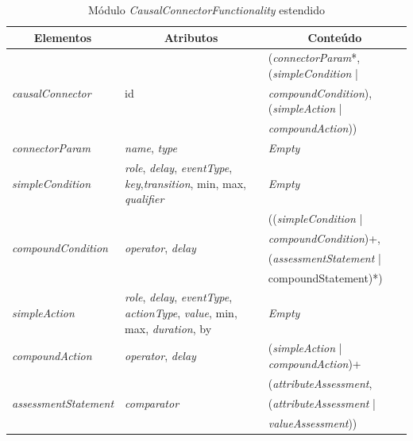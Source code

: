 \begin{table}[!ht] \footnotesize
\caption{Módulo \textit{CausalConnectorFunctionality} estendido \cite{ITU:2009ma}}
\label{tab:extCausal}
\centering
{
 \renewcommand\arraystretch{1.0}
 \begin{tabular}{|p{4cm}|p{5cm}|p{6cm}|} \hline
  \multicolumn{1}{|c|}{Elementos} & \multicolumn{1}{c|}{Atributos} & \multicolumn{1}{c|}{Conteúdo} \\\hline 
  \multirow{3}{*}{\textit{causalConnector}} & \multirow{3}{*}{id} & (\textit{connectorParam}*, (\textit{simpleCondition} |\\
                                        && \textit{compoundCondition}), (\textit{simpleAction} | \\
                                        && \textit{compoundAction}))\\\hline
   \textit{connectorParam} & \textit{name}, \textit{type} &  \textit{Empty} \\\hline

   \textit{simpleCondition} & \textit{role}, \textit{delay}, \textit{eventType},
                     \textit{key},\textit{transition}, min, max, 
                     \textit{qualifier}                  & \textit{Empty}\\\hline
                     
   \multirow{4}{*}{\textit{compoundCondition}} & \multirow{4}{*}{\textit{operator}, \textit{delay}} &       
                                        ((\textit{simpleCondition} | \\
                                        && \textit{compoundCondition})+,\\
                                        && (\textit{assessmentStatement} |\\
                                        && compo\textit{}undStatement)*)\\\hline                     
    \textit{simpleAction} & \textit{role}, \textit{delay}, \textit{eventType},
                   \textit{actionType}, \textit{value}, min, max,
                   \textit{duration}, by         & \textit{Empty}\\\hline
                   
    \textit{compoundAction} & \textit{operator}, \textit{delay} & (\textit{simpleAction} | \textit{compoundAction})+\\\hline

   \multirow{3}{*}{\textit{assessmentStatement}} & \multirow{3}{*}{\textit{comparator}} 
                                        &(\textit{attributeAssessment},\\
                                        &&(\textit{attributeAssessment} |\\
                                        && \textit{valueAssessment}))\\\hline
                                        

\end{tabular}}
\end{table}

